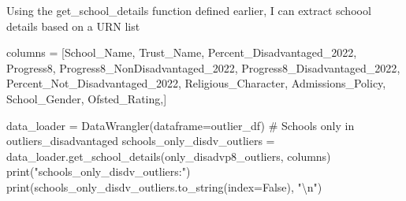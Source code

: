 \documentclass[
  letterpaper,
  DIV=11,
  numbers=noendperiod]{scrartcl}
\newenvironment{Shaded}{\begin{snugshade}}{\end{snugshade}}
\newcommand{\BuiltInTok}[1]{\textcolor[rgb]{0.00,0.23,0.31}{#1}}
\newcommand{\CharTok}[1]{\textcolor[rgb]{0.13,0.47,0.30}{#1}}
\newcommand{\CommentTok}[1]{\textcolor[rgb]{0.37,0.37,0.37}{#1}}
\newcommand{\NormalTok}[1]{\textcolor[rgb]{0.00,0.23,0.31}{#1}}
\newcommand{\OperatorTok}[1]{\textcolor[rgb]{0.37,0.37,0.37}{#1}}
\newcommand{\StringTok}[1]{\textcolor[rgb]{0.13,0.47,0.30}{#1}}
\newcommand{\VariableTok}[1]{\textcolor[rgb]{0.07,0.07,0.07}{#1}}
\begin{document}
Using the get\_school\_details function defined earlier, I can extract
schoool details based on a URN list

\begin{Shaded}
\begin{Highlighting}[]
\NormalTok{columns }\OperatorTok{=}\NormalTok{ [}\StringTok{\textquotesingle{}School\_Name\textquotesingle{}}\NormalTok{,}
 \StringTok{\textquotesingle{}Trust\_Name\textquotesingle{}}\NormalTok{, }\StringTok{\textquotesingle{}Percent\_Disadvantaged\_2022\textquotesingle{}}\NormalTok{, }\StringTok{\textquotesingle{}Progress8\textquotesingle{}}\NormalTok{, }
 \StringTok{\textquotesingle{}Progress8\_NonDisadvantaged\_2022\textquotesingle{}}\NormalTok{, }\StringTok{\textquotesingle{}Progress8\_Disadvantaged\_2022\textquotesingle{}}\NormalTok{,}
  \StringTok{\textquotesingle{}Percent\_Not\_Disadvantaged\_2022\textquotesingle{}}\NormalTok{,}
 \StringTok{\textquotesingle{}Religious\_Character\textquotesingle{}}\NormalTok{,}
\StringTok{\textquotesingle{}Admissions\_Policy\textquotesingle{}}\NormalTok{,}
\StringTok{\textquotesingle{}School\_Gender\textquotesingle{}}\NormalTok{,}
\StringTok{\textquotesingle{}Ofsted\_Rating\textquotesingle{}}\NormalTok{,]}

\NormalTok{data\_loader }\OperatorTok{=}\NormalTok{ DataWrangler(dataframe}\OperatorTok{=}\NormalTok{outlier\_df)}
\CommentTok{\# Schools only in outliers\_disadvantaged}
\NormalTok{schools\_only\_disdv\_outliers }\OperatorTok{=}\NormalTok{ data\_loader.get\_school\_details(only\_disadvp8\_outliers, columns)}
\BuiltInTok{print}\NormalTok{(}\StringTok{"schools\_only\_disdv\_outliers:"}\NormalTok{)}
\BuiltInTok{print}\NormalTok{(schools\_only\_disdv\_outliers.to\_string(index}\OperatorTok{=}\VariableTok{False}\NormalTok{), }\StringTok{"}\CharTok{\textbackslash{}n}\StringTok{"}\NormalTok{)}

\end{Highlighting}
\end{Shaded}
\end{document}
